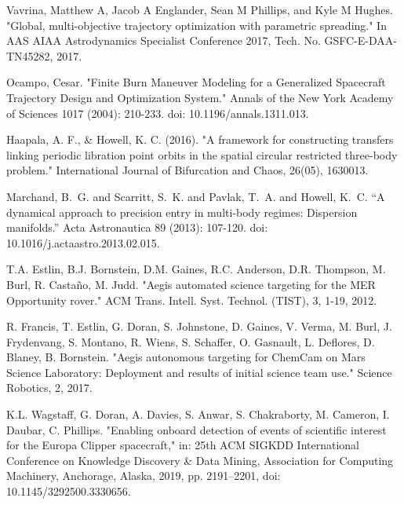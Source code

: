 \documentclass[a4paper]{article}
\begin{document}
\noindent
\newpage

%

%	

	\begin{thebibliography}{1}
		
		
		Vavrina, Matthew A, Jacob A Englander, Sean M Phillips, and Kyle M Hughes.
		"Global, multi-objective trajectory optimization with parametric spreading."
		In AAS AIAA Astrodynamics Specialist Conference 2017, Tech. No. GSFC-E-DAA-TN45282, 2017.	
		
		
		Ocampo, Cesar.
		"Finite Burn Maneuver Modeling for a Generalized Spacecraft Trajectory Design and Optimization System."
		Annals of the New York Academy of Sciences 1017 (2004): 210-233.
		doi: 10.1196/annals.1311.013.
		
		
		Haapala, A. F., \& Howell, K. C. (2016).
		"A framework for constructing transfers linking periodic libration point orbits in the spatial circular restricted three-body problem."
		International Journal of Bifurcation and Chaos, 26(05), 1630013.
		
		
		Marchand, B.~G. and Scarritt, S.~K. and Pavlak, T.~A. and Howell, K.~C.
		``A dynamical approach to precision entry in multi-body regimes: Dispersion manifolds.''
		Acta Astronautica 89 (2013): 107-120.
		doi: 10.1016/j.actaastro.2013.02.015.
		
		T.A. Estlin, B.J. Bornstein, D.M. Gaines, R.C. Anderson, D.R. Thompson, M. Burl, R. Castaño, M. Judd.
		"Aegis automated science targeting for the MER Opportunity rover."
		ACM Trans. Intell. Syst. Technol. (TIST), 3, 1-19, 2012.
		
		R. Francis, T. Estlin, G. Doran, S. Johnstone, D. Gaines, V. Verma, M. Burl, J. Frydenvang, S. Montano, R. Wiens, S. Schaffer, O. Gasnault, L. Deflores, D. Blaney, B. Bornstein.
		"Aegis autonomous targeting for ChemCam on Mars Science Laboratory: Deployment and results of initial science team use."
		Science Robotics, 2, 2017.
		
		K.L. Wagstaff, G. Doran, A. Davies, S. Anwar, S. Chakraborty, M. Cameron, I. Daubar, C. Phillips.
		"Enabling onboard detection of events of scientific interest for the Europa Clipper spacecraft,"
		in: 25th ACM SIGKDD International Conference on Knowledge Discovery \& Data Mining,
		Association for Computing Machinery, Anchorage, Alaska, 2019, pp. 2191--2201,
		doi: 10.1145/3292500.3330656.
		

\end{thebibliography}
\end{document}
